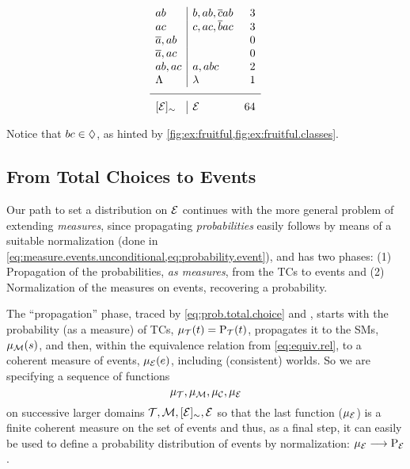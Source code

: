 \documentclass[x11names]{tlp}
\begin{document}
\begin{example}
\begin{equation*}
\begin{array}{l|lr}
				ab     & b, ab, \co{c}ab                                                                    & 3 \\%
				ac     & c, ac, \co{b}ac                                                                    & 3 \\%
				\co{a}, ab
				       &
				       & 0                                                                                      %
				\\
				\co{a}, ac
				       &
				       & 0
				\\
				ab, ac & a, abc                                                                             & 2 \\%
				\consequenceclass
				       & \emptyevent
				       & 1
				\\
				\hline \class{\EVENTSset}
				       & \EVENTSset
				       & 64
			\end{array}
		\end{equation*}

		Notice that $bc \in \Diamond$, as hinted by
		\cref{fig:ex:fruitful,fig:ex:fruitful.classes}.
	\end{example}
\fi

\subsection{From Total Choices to Events}
\label{subsec:from.tchoices.to.events}

Our path to set a distribution on $\EVENTSset$ continues with the more
general problem of extending \emph{measures}, since propagating
\emph{probabilities} easily follows by means of a suitable normalization
(done in \cref{eq:measure.events.unconditional,eq:probability.event}), and
has two phases: (1) Propagation of the probabilities, \emph{as measures},
from the \aclp{TC} to events and (2) Normalization of the measures on events,
recovering a probability.

The ``propagation'' phase, traced by \cref{eq:prob.total.choice} and
, starts with
the probability (as a measure) of \aclp{TC}, $\pwt{t} = \prT\at{t}$,
propagates it to the \aclp{SM}, $\pwm{s}$, and then, within the equivalence
relation from \cref{eq:equiv.rel}, to a coherent measure of events,
$\pwe{e}$, including (consistent) worlds. So we are specifying a sequence of
functions
\begin{equation}
	\pwT , \pwM , \pwC , \pwE\label{eq:sequence.functions}
\end{equation}
on successive larger domains
\(
\TCHOICEset , \MODELset , \class{\EVENTSset} , \EVENTSset
\)
so that the last function ($\pwE$) is a finite coherent measure on
the set of events and thus, as a final step, it can easily be used to
define a probability distribution of events by normalization:
\(
\pwE \longrightarrow \prE
\).
\end{document}
